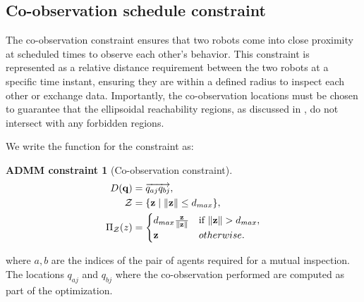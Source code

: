 \documentclass[journal]{IEEEtran}  %
\newtheorem{constraint}{ADMM constraint}
\def\sZ{\mathcal{Z}}
\begin{document}
\subsection{Co-observation schedule constraint}\label{sec:co-observation-constraint}
The co-observation constraint ensures that two robots come into close proximity at scheduled times to observe each other's behavior. This constraint is represented as a relative distance requirement between the two robots at a specific time instant, ensuring they are within a defined radius to inspect each other or exchange data. Importantly, the co-observation locations must be chosen to guarantee that the ellipsoidal reachability regions, as discussed in , do not intersect with any forbidden regions.


 We write the function for the constraint as:
\begin{constraint}[Co-observation constraint]
\begin{align}
D(\vq) &= \overrightarrow{q_{aj}q_{bj}}, \label{eq:waypoint_constraint}\\
  \sZ &= \{\vz \mid \norm{\vz} \leq d_{max} \},\\
   \Pi_\sZ(z) & = \begin{cases}
d_{max}\frac{\vz}{\norm{\vz}} &\text{if } \norm{\vz} > d_{max},\\
\vz	& otherwise.
\end{cases}
\end{align}
\end{constraint}

where $a,b$ are the indices of the pair of agents required for a mutual inspection. The locations $q_{aj}$ and $q_{bj}$ where the co-observation performed are computed as part of the optimization.
\end{document}
